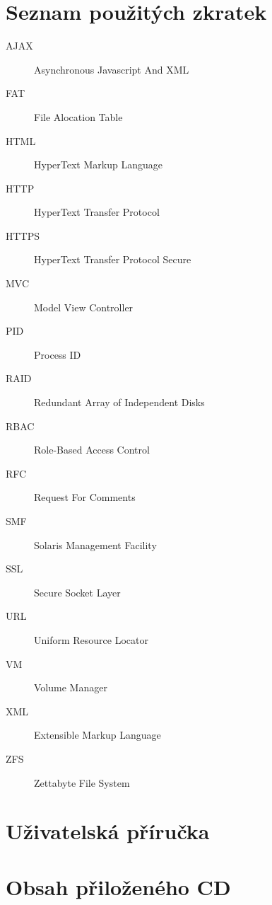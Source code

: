 \documentclass[thesis=B,czech,hidelinks]{FITthesis}[2012/06/26]
\begin{document}
\chapter{Seznam použitých zkratek}
\begin{description}
    \item[AJAX] Asynchronous Javascript And XML
    \item[FAT] File Alocation Table
    \item[HTML] HyperText Markup Language
    \item[HTTP] HyperText Transfer Protocol
    \item[HTTPS] HyperText Transfer Protocol Secure
    \item[MVC] Model View Controller	
    \item[PID] Process ID	
    \item[RAID] Redundant Array of Independent Disks
    \item[RBAC] Role-Based Access Control
    \item[RFC] Request For Comments
    \item[SMF] Solaris Management Facility
    \item[SSL] Secure Socket Layer
    \item[URL] Uniform Resource Locator
    \item[VM] Volume Manager
    \item[XML] Extensible Markup Language
    \item[ZFS] Zettabyte File System
\end{description}

\chapter{Uživatelská příručka}
    

\chapter{Obsah přiloženého CD}


\begin{figure}
\end{figure}
\end{document}
